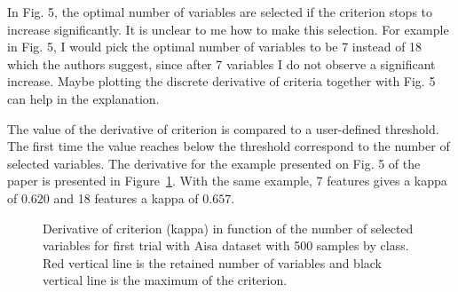 \documentclass[a4paper,10pt,DIV=16]{scrartcl}
\begin{document}
\begin{revbox}
  In Fig. 5, the optimal number of variables are selected if the criterion stops to increase significantly. It is unclear to me how to make this selection. For example in Fig. 5, I would pick the optimal number of variables to be 7 instead of 18 which the authors suggest, since after 7 variables I do not observe a significant increase. Maybe plotting the discrete derivative of criteria together with Fig. 5 can help in the explanation.
  \begin{resbox}
  The value of the derivative of criterion is compared to a user-defined threshold. The first time the value reaches below the threshold correspond to the number of selected variables. The derivative for the example presented on Fig. 5 of the paper is presented in Figure~\ref{fig:deriv}.
  With the same example, 7 features gives a kappa of $0.620$ and 18 features a kappa of $0.657$.

  \end{resbox}
\end{revbox}

\begin{figure}[!ht]
  \centering
  \caption{Derivative of criterion (kappa) in function of the number of selected variables for first trial with Aisa dataset with 500 samples by class. Red vertical line is the retained number of variables and black vertical line is the maximum of the criterion.\label{fig:deriv}}
\end{figure}
\end{document}
